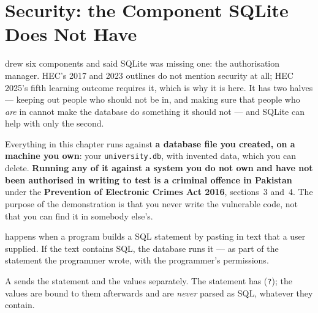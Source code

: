 \section{Security: the Component SQLite Does Not Have}

 drew six components and said SQLite was missing one: the
authorisation manager. HEC's 2017 and 2023 outlines do not mention security at
all; HEC 2025's fifth learning outcome requires it, which is why it is here.
It has two halves --- keeping out people who should not be in, and making sure
that people who \emph{are} in cannot make the database do something it should
not --- and SQLite can help with only the second.

\begin{alertbox}
Everything in this chapter runs against \textbf{a database file you created,
on a machine you own}: your \texttt{university.db}, with invented data, which
you can delete. \textbf{Running any of it against a system you do not own and
have not been authorised in writing to test is a criminal offence in Pakistan}
under the \textbf{Prevention of Electronic Crimes Act 2016}, sections~3 and~4.
The purpose of the demonstration is that you never write the vulnerable code,
not that you can find it in somebody else's.
\end{alertbox}

\begin{definitionbox}
 happens when a program builds a SQL statement by pasting
in text that a user supplied. If the text contains SQL, the database runs it
--- as part of the statement the programmer wrote, with the programmer's
permissions.

\smallskip
A  sends the statement and the values separately.
The statement has  (\texttt{?}); the values are bound to
them afterwards and are \emph{never} parsed as SQL, whatever they contain.
\end{definitionbox}

